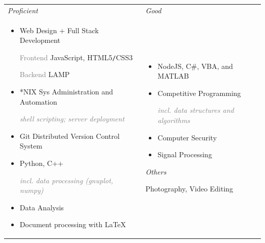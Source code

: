 \documentclass[11pt]{article}
\begin{document}

		{
			\renewcommand{\arraystretch}{1.5}
			\setlength{\tabcolsep}{12pt}
			\begin{tabularx}{\textwidth}{@{} p{} p{} @{}}
				\textcolor{skiheader}{\textit{Proficient}} & \textcolor{skiheader}{\textit{Good}} \\
				\vspace{-1em}
				\begin{itemize}[leftmargin=3mm]
					\renewcommand\labelitemi{}
					\setlength\itemsep{0.8em}
					\item Web Design + Full Stack Development \par
						\vspace{1mm}
						\hspace{1em} \textcolor{gray}{Frontend} \hfill JavaScript, HTML\textcolor{Bittersweet}{5}\texttt{/}CSS\textcolor{Bittersweet}{3} \par
						\hspace{1em} \textcolor{gray}{Backend} \hfill LAMP 
					\item \**NIX Sys Administration and Automation \par
						\hfill \textcolor{gray}{\footnotesize \itshape shell scripting; server deployment}
					\item Git Distributed Version Control System
					\item Python, C++ \par %
						\hfill \textcolor{gray}{\footnotesize \itshape incl. data processing (gnuplot, numpy)}
					\item Data Analysis
					\item Document processing with{\fontfamily{cmr} \selectfont \LaTeX}
				\end{itemize} & 
				\vspace{-1em}
				\begin{itemize}[leftmargin=3mm]
					\renewcommand\labelitemi{}
					\setlength\itemsep{0.9em}
					\item NodeJS, C\#, VBA, and MATLAB 
					\item Competitive Programming \par
						\hfill \textcolor{gray}{\footnotesize \itshape incl. data structures and algorithms}
					\item Computer Security
					\item Signal Processing
				\end{itemize}
				\vspace{1cm}
				\textcolor{skiheader}{\textit{Others}} \par
				\vspace{1mm}
				\hspace{2mm} Photography, Video Editing 


\end{tabularx}}
\end{document}
